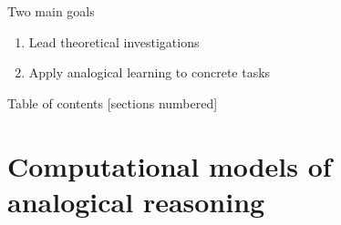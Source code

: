\documentclass{beamer}
\begin{document}
\begin{frame}{Two main goals}
  \begin{enumerate}
    \item Lead \alert{theoretical} investigations
    \item Apply analogical learning to \alert{concrete} tasks
  \end{enumerate}
\end{frame}

\begin{frame}{Table of contents}
  [sections numbered]
  \tableofcontents[hideallsubsections]
\end{frame}

\section[Existing models]{Computational models of analogical reasoning}

\end{document}
